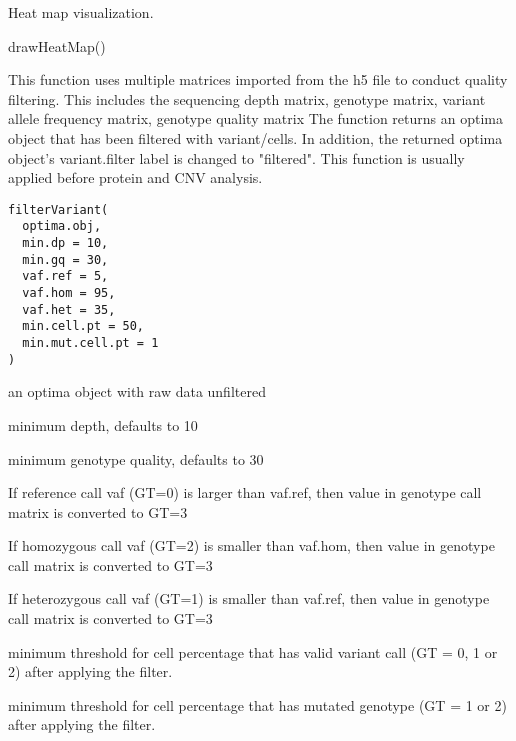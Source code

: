 \documentclass[a4paper]{book}
\begin{document}
%
\begin{Value}
Heat map visualization.
\end{Value}
%
\begin{Examples}
\begin{ExampleCode}
drawHeatMap()
\end{ExampleCode}
\end{Examples}
%
\begin{Description}\relax
This function uses multiple matrices imported from the h5 file to conduct quality filtering.
This includes the sequencing depth matrix, genotype matrix, variant allele frequency matrix, genotype quality matrix
The function returns an optima object that has been filtered with variant/cells.
In addition, the returned optima object's variant.filter label is changed to "filtered".
This function is usually applied before protein and CNV analysis.
\end{Description}
%
\begin{Usage}
\begin{verbatim}
filterVariant(
  optima.obj,
  min.dp = 10,
  min.gq = 30,
  vaf.ref = 5,
  vaf.hom = 95,
  vaf.het = 35,
  min.cell.pt = 50,
  min.mut.cell.pt = 1
)
\end{verbatim}
\end{Usage}
%
\begin{Arguments}
\begin{ldescription}
\item[\code{optima.obj}] an optima object with raw data unfiltered

\item[\code{min.dp}] minimum depth, defaults to 10

\item[\code{min.gq}] minimum genotype quality, defaults to 30

\item[\code{vaf.ref}] If reference call vaf (GT=0) is larger than vaf.ref, then value in genotype call matrix is converted to GT=3

\item[\code{vaf.hom}] If homozygous call vaf (GT=2) is smaller than vaf.hom, then value in genotype call matrix is converted to GT=3

\item[\code{vaf.het}] If heterozygous call vaf (GT=1) is smaller than vaf.ref, then value in genotype call matrix is converted to GT=3

\item[\code{min.cell.pt}] minimum threshold for cell percentage that has valid variant call (GT = 0, 1 or 2) after applying the filter.

\item[\code{min.mut.cell.pt}] minimum threshold for cell percentage that has mutated genotype (GT = 1 or 2) after applying the filter.
\end{ldescription}
\end{Arguments}
\end{document}
